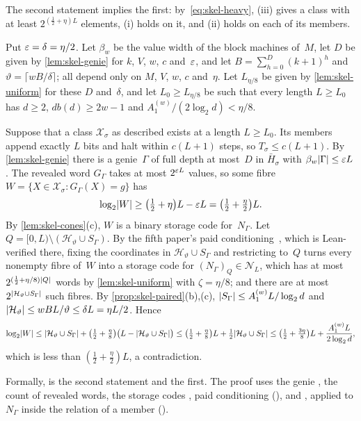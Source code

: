 \begin{outline}
The second statement implies the first: by~\eqref{eq:skel-heavy}, (iii) gives a class with at least
$2^{(\frac12+\eta)L}$ elements, (i) holds on it, and (ii) holds on each of its members.

Put $\varepsilon=\delta=\eta/2$. Let $\beta_w$ be the value width of the block machines of~$M$, let $D$ be given by
\cref{lem:skel-genie} for $k$, $V$, $w$, $c$ and~$\varepsilon$, and let $B=\sum_{h=0}^D(k+1)^h$ and
$\vartheta=\lceil wB/\delta\rceil$; all depend only on $M$, $V$, $w$, $c$ and~$\eta$. Let $L_{\eta/8}$ be given by
\cref{lem:skel-uniform} for these $D$ and~$\delta$, and let $L_0\ge L_{\eta/8}$ be such that every length $L\ge L_0$ has
$d\ge2$, $db(d)\ge2w-1$ and $A^{(w)}_1/(2\log_2d)<\eta/8$.

Suppose that a class $\mathcal X_\sigma$ as described exists at a length $L\ge L_0$. Its members append exactly $L$ bits
and halt within $c(L+1)$ steps, so $T_\sigma\le c(L+1)$. By \cref{lem:skel-genie} there is a genie~$\Gamma$ of full
depth at most~$D$ in $\bar H_\sigma$ with $\beta_w\lvert \Gamma \rvert\le\varepsilon L$. The revealed word $G_\Gamma$ takes at most
$2^{\varepsilon L}$ values, so some fibre $W=\{X\in\mathcal X_\sigma:G_\Gamma(X)=g\}$ has
\[
  \log_2\lvert W \rvert\ge\bigl(\tfrac12+\eta\bigr)L-\varepsilon L=\bigl(\tfrac12+\tfrac\eta2\bigr)L .
\]
By \cref{lem:skel-cones}(c), $W$ is a binary storage code for~$N_\Gamma$. Let
$Q=[0,L)\setminus(\mathcal H_\vartheta\cup S_\Gamma)$. By the fifth paper's paid
conditioning~\cite[Lemma~2.2]{DirectedRecovery2026}, which is Lean-verified there, fixing the coordinates in
$\mathcal H_\vartheta\cup S_\Gamma$ and restricting to~$Q$ turns every nonempty fibre of~$W$ into a storage code for
$(N_\Gamma)_Q\in\mathcal N_L$, which has at most $2^{(\frac12+\eta/8)\lvert Q \rvert}$ words by \cref{lem:skel-uniform} with
$\zeta=\eta/8$; and there are at most $2^{\lvert \mathcal H_\vartheta\cup S_\Gamma \rvert}$ such fibres. By
\cref{prop:skel-paired}(b),(c), $\lvert S_\Gamma \rvert\le A^{(w)}_1L/\log_2d$ and
$\lvert \mathcal H_\vartheta \rvert\le wBL/\vartheta\le\delta L=\eta L/2$. Hence
\[
  \log_2\lvert W \rvert\le\lvert \mathcal H_\vartheta\cup S_\Gamma \rvert+\bigl(\tfrac12+\tfrac\eta8\bigr)
  \bigl(L-\lvert \mathcal H_\vartheta\cup S_\Gamma \rvert\bigr)\le\bigl(\tfrac12+\tfrac\eta8\bigr)L
  +\tfrac12\lvert \mathcal H_\vartheta\cup S_\Gamma \rvert\le\bigl(\tfrac12+\tfrac{3\eta}8\bigr)L+\frac{A^{(w)}_1L}{2\log_2d},
\]
which is less than $(\frac12+\frac\eta2)L$, a contradiction.

Formally,  is the second statement and  the first. The proof uses
the genie , the count  of revealed words, the storage
codes , paid conditioning
(), and , applied to $N_\Gamma$
inside the relation  of a member ().
\end{outline}

